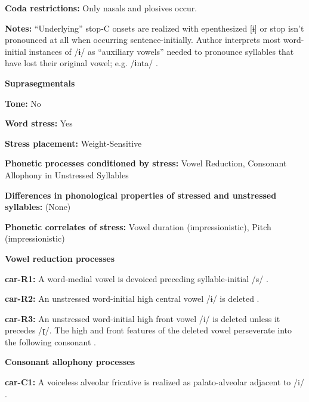 \textbf{Coda restrictions:} Only nasals and plosives occur.



\textbf{Notes:} “Underlying” stop-C onsets are realized with epenthesized [ɨ] or stop isn’t pronounced at all when occurring sentence-initially. Author interprets most word-initial instances of /ɨ/ as “auxiliary vowels” needed to pronounce syllables that have lost their original vowel; e.g. /ɨnta/ \citep[26]{Courtz2008}.



\textbf{Suprasegmentals}



\textbf{Tone:} No



\textbf{Word stress:} Yes



\textbf{Stress placement:} Weight-Sensitive



\textbf{Phonetic processes conditioned by stress:} Vowel Reduction, Consonant Allophony in Unstressed Syllables



\textbf{Differences in phonological properties of stressed and unstressed syllables:} (None)



\textbf{Phonetic correlates of stress:} Vowel duration (impressionistic), Pitch (impressionistic)



\textbf{Vowel reduction processes}



\textbf{car-R1:} A word-medial vowel is devoiced preceding syllable-initial /s/ \citep[38]{Peasgood1972}.



\textbf{car-R2:} An unstressed word-initial high central vowel /ɨ/ is deleted \citep[40]{Courtz2008}.



\textbf{car-R3:} An unstressed word-initial high front vowel /i/ is deleted unless it precedes /ɽ/. The high and front features of the deleted vowel perseverate into the following consonant \citep[41]{Courtz2008}.



\textbf{Consonant allophony processes}



\textbf{car-C1:} A voiceless alveolar fricative is realized as palato-alveolar adjacent to /i/ \citep[32]{Courtz2008}.



